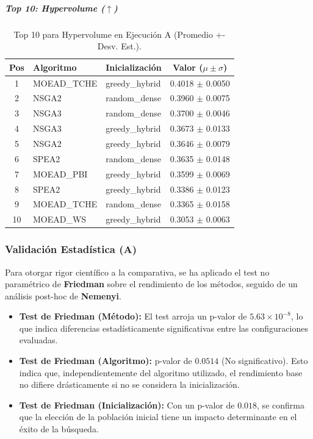 \documentclass[a4paper,10pt]{article}
\begin{document}
\subparagraph{Top 10: Hypervolume ($\uparrow$)}
\begin{table}[H]
    \centering
    \begin{tabular}{cllc}
        \toprule
        Pos & Algoritmo & Inicialización & Valor ($\mu \pm \sigma$) \\
        \midrule
        1 & MOEAD\_TCHE & greedy\_hybrid & 0.4018 $\pm$ 0.0050 \\
        2 & NSGA2 & random\_dense & 0.3960 $\pm$ 0.0075 \\
        3 & NSGA3 & random\_dense & 0.3700 $\pm$ 0.0046 \\
        4 & NSGA3 & greedy\_hybrid & 0.3673 $\pm$ 0.0133 \\
        5 & NSGA2 & greedy\_hybrid & 0.3646 $\pm$ 0.0079 \\
        6 & SPEA2 & random\_dense & 0.3635 $\pm$ 0.0148 \\
        7 & MOEAD\_PBI & greedy\_hybrid & 0.3599 $\pm$ 0.0069 \\
        8 & SPEA2 & greedy\_hybrid & 0.3386 $\pm$ 0.0123 \\
        9 & MOEAD\_TCHE & random\_dense & 0.3365 $\pm$ 0.0158 \\
        10 & MOEAD\_WS & greedy\_hybrid & 0.3053 $\pm$ 0.0063 \\
        \bottomrule
    \end{tabular}
    \caption{Top 10 para Hypervolume en Ejecución A (Promedio +- Desv. Est.).}
\end{table}


\subsubsection{Validación Estadística (A)}
Para otorgar rigor científico a la comparativa, se ha aplicado el test no paramétrico de \textbf{Friedman} sobre el rendimiento de los métodos, seguido de un análisis post-hoc de \textbf{Nemenyi}. 

\begin{itemize}
    \item \textbf{Test de Friedman (Método):} El test arroja un p-valor de $5.63 \times 10^{-8}$, lo que indica diferencias estadísticamente significativas entre las configuraciones evaluadas.
    \item \textbf{Test de Friedman (Algoritmo):} p-valor de $0.0514$ (No significativo). Esto indica que, independientemente del algoritmo utilizado, el rendimiento base no difiere drásticamente si no se considera la inicialización.
    \item \textbf{Test de Friedman (Inicialización):} Con un p-valor de $0.018$, se confirma que la elección de la población inicial tiene un impacto determinante en el éxito de la búsqueda.
\end{itemize}
\end{document}
